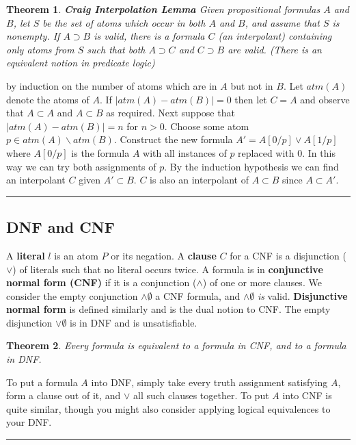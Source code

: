 \documentclass[twoside]{article}
\newcounter{lecnum}
\newtheorem{theorem}{Theorem}[lecnum]
\newenvironment{proof}{{\bf Proof:}}{\hfill\rule{2mm}{2mm}}
\begin{document}
\begin{theorem}
\textbf{Craig Interpolation Lemma} Given propositional formulas $A$ and $B$, let $S$ be the set of atoms which occur in both $A$ and $B$, and assume that $S$ is nonempty. If $A \supset B$ is valid, there is a formula $C$ (an \emph{interpolant}) containing only atoms from $S$ such that both $A \supset C$ and $C \supset B$ are valid. (There is an equivalent notion in predicate logic)
\end{theorem}
\begin{proof}
by induction on the number of atoms which are in $A$ but not in $B$. Let $atm(A)$ denote the atoms of $A$. If $|atm(A) - atm(B)| = 0$ then let $C = A$ and observe that $A \subset A$ and $A \subset B$ as required. Next suppose that $|atm(A) - atm(B)| = n$ for $n > 0$. Choose some atom $p \in atm(A) \backslash atm(B)$. Construct the new formula $A' = A[0/p] \lor A[1/p]$ where $A[0/p]$ is the formula $A$ with all instances of $p$ replaced with $0$. In this way we can try both assignments of $p$. By the induction hypothesis we can find an interpolant $C$ given $A' \subset B$. $C$ is also an interpolant of $A \subset B$ since $A \subset A'$.   
\end{proof}

\subsection{DNF and CNF}
A \textbf{literal} $l$ is an atom $P$ or its negation. A \textbf{clause} $C$ for a CNF is a disjunction ($\lor$) of literals such that no literal occurs twice. A formula is in \textbf{conjunctive normal form (CNF)} if it is a conjunction ($\land$) of one or more clauses. We consider the empty conjunction $\land \emptyset$ a CNF formula, and $\land \emptyset$ \emph{is} valid. \textbf{Disjunctive normal form} is defined similarly and is the dual notion to CNF. The empty disjunction $\lor \emptyset$ is in DNF and is unsatisfiable. 

\begin{theorem}
Every formula is equivalent to a formula in CNF, and to a formula in DNF. 
\end{theorem} 
\begin{proof}
To put a formula $A$ into DNF, simply take every truth assignment satisfying $A$, form a clause out of it, and $\lor$ all such clauses together. To put $A$ into CNF is quite similar, though you might also consider applying logical equivalences to your DNF.    
\end{proof}
\end{document}
